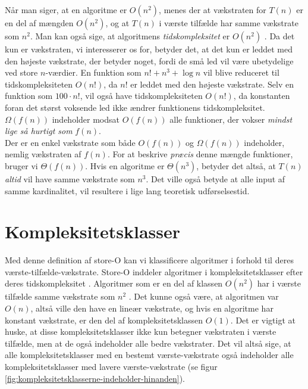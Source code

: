 Når man siger, at en algoritme er $O(n^2)$, menes der at vækstraten for $T(n)$ er en del af mængden $O(n^2)$, og at $T(n)$ i værste tilfælde har samme vækstrate som $n^2$. Man kan også sige, at algoritmens \emph{tidskompleksitet} er $O(n^2)$ \cite{time-complexity-use}. Da det kun er vækstraten, vi interesserer os for, betyder det, at det kun er leddet med den højeste vækstrate, der betyder noget, fordi de små led vil være ubetydelige ved store $n$-værdier. En funktion som $n! + n^3+\log n$ vil blive reduceret til tidskompleksiteten $O(n!)$, da $n!$ er leddet med den højeste vækstrate. Selv en funktion som $100 \cdot n!$, vil også have tidskompleksiteten $O(n!)$, da konstanten foran det størst voksende led ikke ændrer funktionens tidskompleksitet.\\

$\Omega (f(n))$ indeholder modsat $O(f(n))$ alle funktioner, der vokser \emph{mindst lige så hurtigt som} $f(n)$.\\ 

Der er en enkel vækstrate som både $O(f(n))$ og $\Omega (f(n))$ indeholder, nemlig vækstraten af $f(n)$. For at beskrive \emph{præcis} denne mængde funktioner, bruger vi $\Theta (f(n))$. Hvis en algoritme er $\Theta (n^3)$, betyder det altså, at $T(n)$ \emph{altid} vil have samme vækstrate som $n^3$. Det ville også betyde at alle input af samme kardinalitet, vil resultere i lige lang teoretisk udførselsestid.


\section{Kompleksitetsklasser} 
\label{sec:Kompleksitetsklasser}


Med denne definition af store-O kan vi klassificere algoritmer i forhold til deres værste-tilfælde-vækstrate. Store-O inddeler algoritmer i kompleksitetsklasser efter deres tidskompleksitet \cite{time-complexity}. Algoritmer som er en del af klassen $O(n^2)$ har i værste tilfælde samme vækstrate som $n^2$ . Det kunne også være, at algoritmen var $O(n)$, altså ville den have en lineær vækstrate, og hvis en algoritme har konstant vækstrate, er den del af kompleksitetsklassen $O(1)$. Det er vigtigt at huske, at disse kompleksitetsklasser ikke kun betegner vækstraten i værste tilfælde, men at de også indeholder alle bedre vækstrater. Det vil altså sige, at alle kompleksitetsklasser med en bestemt værste-vækstrate også indeholder alle kompleksitetsklasser med lavere værste-vækstrate (se figur \ref{fig:kompleksitetsklasserne-indeholder-hinanden}).



